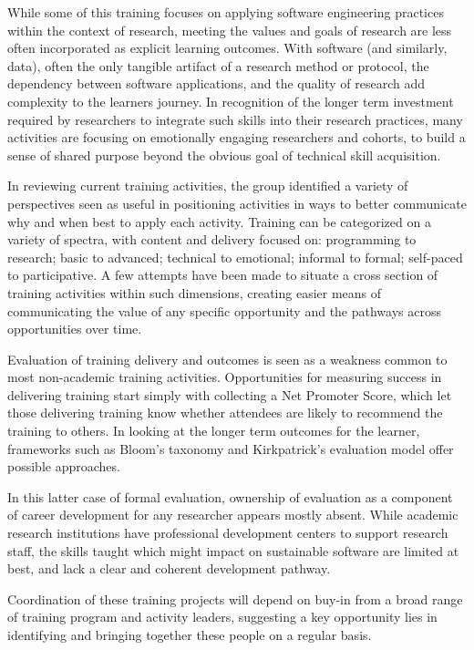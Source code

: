 While some of this training focuses on applying software engineering practices
within the context of research, meeting the values and goals of research are
less often incorporated as explicit learning outcomes. With software (and
similarly, data), often the only tangible artifact of a research method or
protocol, the dependency between software applications, and the quality of
research add complexity to the learners journey. In recognition of the longer
term investment required by researchers to integrate such skills into their
research practices, many activities are focusing on emotionally engaging
researchers and cohorts, to build a sense of shared purpose beyond the obvious
goal of technical skill acquisition.

In reviewing current training activities, the group identified a variety of
perspectives seen as useful in positioning activities in ways to better
communicate why and when best to apply each activity. Training can be
categorized on a variety of spectra, with content and delivery focused on:
programming to research; basic to advanced; technical to emotional; informal to
formal; self-paced to participative. A few attempts have been made to situate a
cross section of training activities within such dimensions, creating easier
means of communicating the value of any specific opportunity and the pathways
across opportunities over time.

Evaluation of training delivery and outcomes is seen as a weakness common to
most non-academic training activities. Opportunities for measuring success in
delivering training start simply with collecting a Net Promoter Score, which
let those delivering training know whether attendees are likely to recommend
the training to others. In looking at the longer term outcomes for the learner,
frameworks such as Bloom's taxonomy and Kirkpatrick's evaluation model offer possible
approaches.

In this latter case of formal evaluation, ownership of evaluation as a component
of career development for any researcher appears mostly absent. While academic
research institutions have professional development centers to support research
staff, the skills taught which might impact on sustainable software are limited
at best, and lack a clear and coherent development pathway.

Coordination of these training projects will depend on buy-in from a broad range
of training program and activity leaders, suggesting a key opportunity lies in
identifying and bringing together these people on a regular basis.

